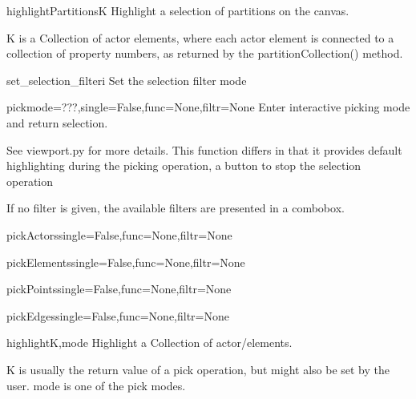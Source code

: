 \begin{funcdesc}{highlightPartitions}{K}
Highlight a selection of partitions on the canvas.

    K is a Collection of actor elements, where each actor element is
    connected to a collection of property numbers, as returned by the
    partitionCollection() method.
    

\end{funcdesc}


\begin{funcdesc}{set_selection_filter}{i}
Set the selection filter mode

\end{funcdesc}


\begin{funcdesc}{pick}{mode=???,single=False,func=None,filtr=None}
Enter interactive picking mode and return selection.

    See viewport.py for more details.
    This function differs in that it provides default highlighting
    during the picking operation, a button to stop the selection operation

    If no filter is given, the available filters are presented in a combobox.
    

\end{funcdesc}


\begin{funcdesc}{pickActors}{single=False,func=None,filtr=None}


\end{funcdesc}


\begin{funcdesc}{pickElements}{single=False,func=None,filtr=None}


\end{funcdesc}


\begin{funcdesc}{pickPoints}{single=False,func=None,filtr=None}


\end{funcdesc}


\begin{funcdesc}{pickEdges}{single=False,func=None,filtr=None}


\end{funcdesc}


\begin{funcdesc}{highlight}{K,mode}
Highlight a Collection of actor/elements.

    K is usually the return value of a pick operation, but might also
    be set by the user.
    mode is one of the pick modes.
    

\end{funcdesc}


